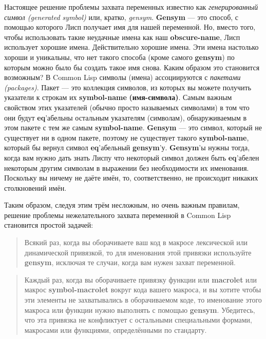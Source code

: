 Настоящее решение проблемы захвата переменных известно как \emph{генерированный символ (generated symbol)} или, кратко, \emph{gensym}. \textbf{Gensym} --- это способ, с помощью которого Лисп получает имя для нашей переменной. Но, вместо того, чтобы использовать такие неудачные имена как наш \textbf{obscure-name}, Лисп использует хорошие имена. Действительно хорошие имена. Эти имена настолько хороши и уникальны, что нет такого способа (кроме самого \textbf{gensym}) по которым можно было бы создать такое имя снова. Каким образом это становится возможным? В Common Lisp символы (имена) ассоциируются с \emph{пакетами (packages)}. Пакет --- это коллекция символов, из которых вы можете получить указатели к строкам их \textbf{symbol-name} \textbf{(имя-символа)}. Самым важным свойством этих указателей (обычно просто называемых символами) в том что они будут \textbf{eq}'абельны остальным указателям (символам), обнаруживаемым в этом пакете с тем же самым \textbf{symbol-name}. \textbf{Gensym} --- это символ, который не существует ни в одном пакете, поэтому не существует такого \textbf{symbol-name}, который бы вернул символ \textbf{eq}'абельный \textbf{gensym}'у. \textbf{Gensym}'ы нужны тогда, когда вам нужно дать знать Лиспу что некоторый символ должен быть \textbf{eq}'абелен некоторым другим символам в выражении без необходимости их именования. Поскольку вы ничему не даёте имён, то, соответственно, не происходит никаких столкновений имён.

Таким образом, следуя этим трём несложным, но очень важным правилам, решение проблемы нежелательного захвата переменной в {Common Lisp} становится простой задачей:

\begin{quote}
Всякий раз, когда вы оборачиваете ваш код в макросе лексической или динамической привязкой, то для именования этой привязки используйте \textbf{gensym}, исключая те случаи, когда вам нужен захват переменной.
\end{quote}

\begin{quote}
Каждый раз, когда вы оборачиваете привязку функции или \textbf{macrolet} или макрос \textbf{symbol-macrolet} вокруг кода вашего макроса, и вы хотите чтобы эти элементы не захватывались в оборачиваемом коде, то именование этого макроса или функции нужно выполнять с помощью \textbf{gensym}. Убедитесь, что эта привязка не конфликтует с остальными специальными формами, макросами или функциями, определёнными по стандарту.
\end{quote}

